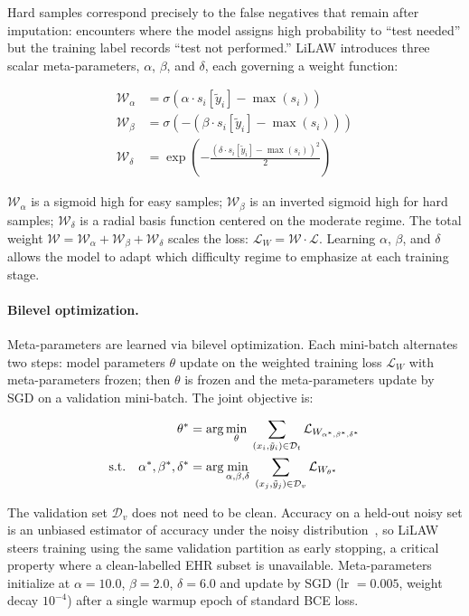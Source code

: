Hard samples correspond precisely to the false negatives that remain after imputation: encounters where the model assigns high probability to ``test needed'' but the training label records ``test not performed.'' LiLAW introduces three scalar meta-parameters, $\alpha$, $\beta$, and $\delta$, each governing a weight function:

\begin{align}
    \mathcal{W}_\alpha &= \sigma\!\left(\alpha \cdot s_i[\tilde{y}_i] - \max(s_i)\right) \\
    \mathcal{W}_\beta  &= \sigma\!\left(-\left(\beta \cdot s_i[\tilde{y}_i] - \max(s_i)\right)\right) \\
    \mathcal{W}_\delta &= \exp\!\left(-\frac{\left(\delta \cdot s_i[\tilde{y}_i] - \max(s_i)\right)^2}{2}\right)
\end{align}

$\mathcal{W}_\alpha$ is a sigmoid high for easy samples; $\mathcal{W}_\beta$ is an inverted sigmoid high for hard samples; $\mathcal{W}_\delta$ is a radial basis function centered on the moderate regime. The total weight $\mathcal{W} = \mathcal{W}_\alpha + \mathcal{W}_\beta + \mathcal{W}_\delta$ scales the loss: $\mathcal{L}_W = \mathcal{W} \cdot \mathcal{L}$. Learning $\alpha$, $\beta$, and $\delta$ allows the model to adapt which difficulty regime to emphasize at each training stage.

\paragraph{Bilevel optimization.}

Meta-parameters are learned via bilevel optimization. Each mini-batch alternates two steps: model parameters $\theta$ update on the weighted training loss $\mathcal{L}_W$ with meta-parameters frozen; then $\theta$ is frozen and the meta-parameters update by SGD on a validation mini-batch. The joint objective is:

\begin{align}
    \theta^* &= \arg\min_{\theta}\; \sum_{(x_i, \tilde{y}_i) \in \mathcal{D}_t} \mathcal{L}_{W_{\alpha^*,\beta^*,\delta^*}} \notag \\
    \text{s.t.}\quad \alpha^*, \beta^*, \delta^* &= \arg\min_{\alpha,\beta,\delta}\; \sum_{(x_j, \tilde{y}_j) \in \mathcal{D}_v} \mathcal{L}_{W_{\theta^*}}
\end{align}

The validation set $\mathcal{D}_v$ does not need to be clean. Accuracy on a held-out noisy set is an unbiased estimator of accuracy under the noisy distribution~\cite{moturu_lilaw_2025}, so LiLAW steers training using the same validation partition as early stopping, a critical property where a clean-labelled EHR subset is unavailable. Meta-parameters initialize at $\alpha = 10.0$, $\beta = 2.0$, $\delta = 6.0$ and update by SGD (lr $= 0.005$, weight decay $10^{-4}$) after a single warmup epoch of standard BCE loss.

